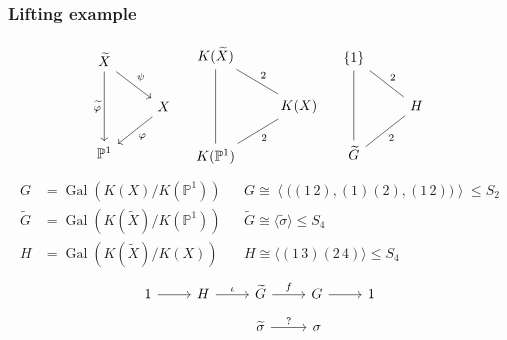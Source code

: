 \documentclass[xcolor=dvipsnames]{beamer}
\DeclareMathOperator{\Gal}{Gal}
\theoremstyle{plain}
\newcommand{\PP}{\mathbb P}
\begin{document}

  \begin{frame}[plain]
    \frametitle{Lifting example \Coffeecup}
    \pause
    \[
      \begin{tikzcd}[ampersand replacement=\&]
        \widetilde{X}\arrow{dd}[swap]{\widetilde{\varphi}}\arrow{dr}{\psi}\\
        \&X\arrow{dl}{\varphi}\\
        \PP^1
      \end{tikzcd}
      \quad
      \begin{tikzcd}[ampersand replacement=\&]
        K(\widetilde{X})\arrow[-]{dd}[swap]{}\arrow[-]{dr}{2}\\
        \&K(X)\arrow[-]{dl}{2}\\
        K(\PP^1)
      \end{tikzcd}
      \quad
      \begin{tikzcd}[ampersand replacement=\&]
        \{1\}\arrow[-]{dd}[swap]{}\arrow[-]{dr}{2}\\
        \&H\arrow[-]{dl}{2}\\
        \widetilde{G}
      \end{tikzcd}
    \]
    \pause
    \begin{align*}
      G &= \Gal(K(X)/K(\PP^1))&&G\cong\left\langle\Big((1\,2),(1)(2),(1\,2)\Big)\right\rangle\leq S_2\\
      \widetilde{G} &= \Gal(K(\widetilde{X})/K(\PP^1))&&\widetilde{G}\cong\langle\widetilde{\sigma}\rangle\leq S_{4}\\
      H &= \Gal(K(\widetilde{X})/K(X))&&H\cong\langle(1\,3)(2\,4)\rangle\leq S_{4}
    \end{align*}
    \pause
    \[
      \begin{tikzcd}[ampersand replacement=\&, row sep = small]
        1\arrow{r}\&H\arrow{r}{\iota}\&\widetilde{G}\arrow{r}{f}\&G\arrow{r}\&1\\
        \&\&\widetilde{\sigma}\arrow{r}{?}\&\sigma
      \end{tikzcd}
    \]
  \end{frame}
\end{document}
